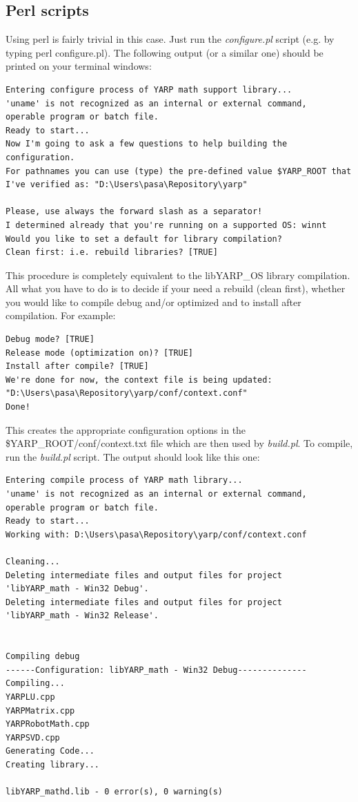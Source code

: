 \subsection{Perl scripts}
Using perl is fairly trivial in this case. Just run the {\em configure.pl} script (e.g. by typing perl configure.pl). The following output (or a similar one) should be printed on your terminal windows:

\begin{verbatim}
Entering configure process of YARP math support library...
'uname' is not recognized as an internal or external command,
operable program or batch file.
Ready to start...
Now I'm going to ask a few questions to help building the configuration. 
For pathnames you can use (type) the pre-defined value $YARP_ROOT that 
I've verified as: "D:\Users\pasa\Repository\yarp"

Please, use always the forward slash as a separator!
I determined already that you're running on a supported OS: winnt
Would you like to set a default for library compilation?
Clean first: i.e. rebuild libraries? [TRUE]
\end{verbatim}

This procedure is completely equivalent to the libYARP\_OS library compilation. All what you have to do is to decide if your need a rebuild (clean first), whether you would like to compile debug and/or optimized and to install after compilation. For example:

\begin{verbatim}
Debug mode? [TRUE]
Release mode (optimization on)? [TRUE]
Install after compile? [TRUE]
We're done for now, the context file is being updated: 
"D:\Users\pasa\Repository\yarp/conf/context.conf"
Done!
\end{verbatim}

This creates the appropriate configuration options in the \$YARP\_ROOT/conf/context.txt file which are then used by {\em build.pl}. To compile, run the {\em build.pl} script. The output should look like this one:

\begin{verbatim}
Entering compile process of YARP math library...
'uname' is not recognized as an internal or external command,
operable program or batch file.
Ready to start...
Working with: D:\Users\pasa\Repository\yarp/conf/context.conf

Cleaning...
Deleting intermediate files and output files for project 
'libYARP_math - Win32 Debug'.
Deleting intermediate files and output files for project 
'libYARP_math - Win32 Release'.


Compiling debug
------Configuration: libYARP_math - Win32 Debug--------------
Compiling...
YARPLU.cpp
YARPMatrix.cpp
YARPRobotMath.cpp
YARPSVD.cpp
Generating Code...
Creating library...

libYARP_mathd.lib - 0 error(s), 0 warning(s)
\end{verbatim}

